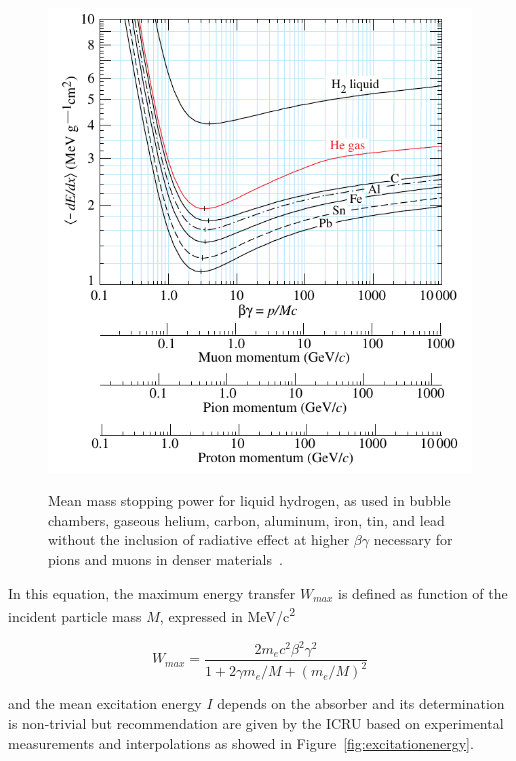 	\begin{figure}[H]
		\centering
		\includegraphics[width = 0.8\plotwidth]{fig/chapt4/dedx_table_98.pdf}\\
		\caption{\label{fig:enerlyloss} Mean mass stopping power for liquid hydrogen, as used in bubble chambers, gaseous helium, carbon, aluminum, iron, tin, and lead without the inclusion of radiative effect at higher $\beta\gamma$ necessary for pions and muons in denser materials~\cite{PDG2016}.}
	\end{figure}
	
	In this equation, the maximum energy transfer $W_{max}$ is defined as function of the incident particle mass $M$, expressed in \si{MeV/c^2}
	
	\begin{equation}
	\label{eq:maxenergytrans}
	W_{max} = \frac{2m_ec^2\beta^2\gamma^2}{1 + 2\gamma m_e/M + (m_e/M)^2}
	\end{equation}
	
	and the mean excitation energy $I$ depends on the absorber and its determination is non-trivial but recommendation are given by the \acf{ICRU} based on experimental measurements and interpolations as showed in Figure~\ref{fig:excitationenergy}.
	
